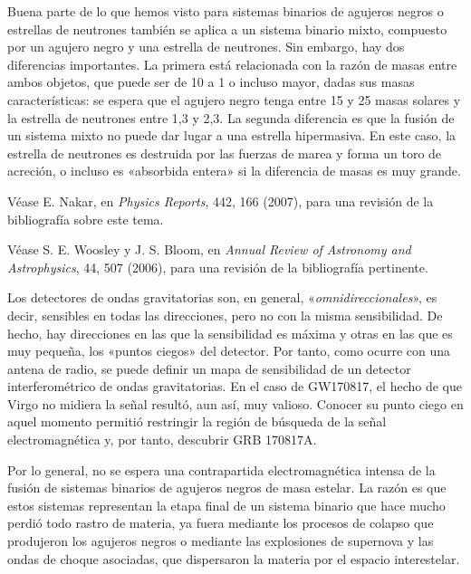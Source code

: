 \begin{description}[style=multiline,leftmargin=2em,labelwidth=1.5em]
\item[8.]\hypertarget{note:08-08}{}Buena parte de lo que hemos visto para sistemas binarios de agujeros negros o estrellas de neutrones también se aplica a un sistema binario mixto, compuesto por un agujero negro y una estrella de neutrones. Sin embargo, hay dos diferencias importantes. La primera está relacionada con la razón de masas entre ambos objetos, que puede ser de 10 a 1 o incluso mayor, dadas sus masas características: se espera que el agujero negro tenga entre 15 y 25 masas solares y la estrella de neutrones entre 1,3 y 2,3. La segunda diferencia es que la fusión de un sistema mixto no puede dar lugar a una estrella hipermasiva. En este caso, la estrella de neutrones es destruida por las fuerzas de marea y forma un toro de acreción, o incluso es «absorbida entera» si la diferencia de masas es muy grande.

\item[9.]\hypertarget{note:08-09}{}Véase E. Nakar, en \emph{Physics Reports}, 442, 166 (2007), para una revisión de la bibliografía sobre este tema.

\item[10.]\hypertarget{note:08-10}{}Véase S. E. Woosley y J. S. Bloom, en \emph{Annual Review of Astronomy and Astrophysics}, 44, 507 (2006), para una revisión de la bibliografía pertinente.

\item[11.]\hypertarget{note:08-11}{}Los detectores de ondas gravitatorias son, en general, «\emph{omnidireccionales}», es decir, sensibles en todas las direcciones, pero no con la misma sensibilidad. De hecho, hay direcciones en las que la sensibilidad es máxima y otras en las que es muy pequeña, los «puntos ciegos» del detector. Por tanto, como ocurre con una antena de radio, se puede definir un mapa de sensibilidad de un detector interferométrico de ondas gravitatorias. En el caso de GW170817, el hecho de que Virgo no midiera la señal resultó, aun así, muy valioso. Conocer su punto ciego en aquel momento permitió restringir la región de búsqueda de la señal electromagnética y, por tanto, descubrir GRB 170817A.

\item[12.]\hypertarget{note:08-12}{}Por lo general, no se espera una contrapartida electromagnética intensa de la fusión de sistemas binarios de agujeros negros de masa estelar. La razón es que estos sistemas representan la etapa final de un sistema binario que hace mucho perdió todo rastro de materia, ya fuera mediante los procesos de colapso que produjeron los agujeros negros o mediante las explosiones de supernova y las ondas de choque asociadas, que dispersaron la materia por el espacio interestelar.


\end{description}
